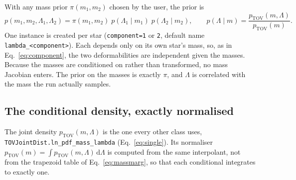 \documentclass[11pt,a4paper]{article}
\newcommand{\dd}{\mathrm{d}}
\newcommand{\code}[1]{\texttt{#1}}
\begin{document}
With any mass prior $\pi(m_1, m_2)$ chosen by the user, the prior is
\begin{equation}
  p(m_1, m_2, \Lambda_1, \Lambda_2)
  = \pi(m_1, m_2)\; p(\Lambda_1 \mid m_1)\; p(\Lambda_2 \mid m_2),
  \qquad
  p(\Lambda \mid m) = \frac{p_{\mathrm{TOV}}(m, \Lambda)}{p_{\mathrm{TOV}}(m)} .
  \label{eq:conditional}
\end{equation}
One instance is created per star (\code{component=1} or \code{2}, default name
\code{lambda\_<component>}). Each depends only on its own star's mass, so, as in
Eq.~\eqref{eq:component}, the two deformabilities are independent given the
masses. Because the masses are conditioned on rather than transformed, no mass
Jacobian enters. The prior on the masses is exactly $\pi$, and $\Lambda$ is
correlated with the mass the run actually samples.

\subsection{The conditional density, exactly normalised}

The joint density $p_{\mathrm{TOV}}(m, \Lambda)$ is the one every other class
uses, \code{TOVJointDist.ln\_pdf\_mass\_lambda} (Eq.~\ref{eq:single}). Its
normaliser $p_{\mathrm{TOV}}(m) = \int p_{\mathrm{TOV}}(m, \Lambda)\,\dd\Lambda$
is computed from the same interpolant, not from the trapezoid table of
Eq.~\eqref{eq:massmarg}, so that each conditional integrates to exactly one.
\end{document}
